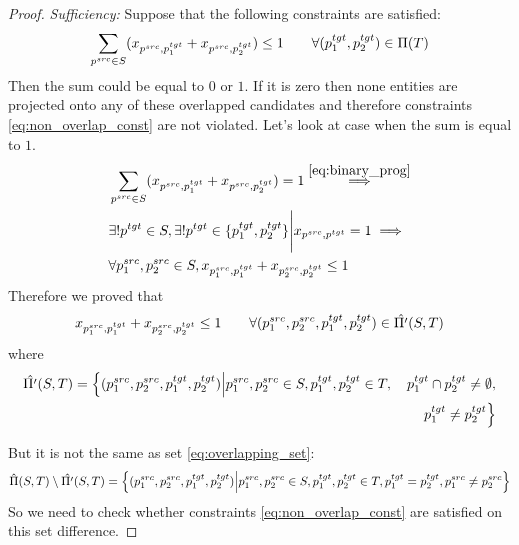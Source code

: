 \begin{proof}
    \textit{Sufficiency:}
    Suppose that the following constraints are satisfied:
    \[
        \sum\limits_{p^{src} \in S} (x_{p^{src}, p_1^{tgt}} + x_{p^{src}, p_2^{tgt}}) \leq 1
        \qquad \forall (p_1^{tgt}, p_2^{tgt}) \in \Pi(T)
    \]
    Then the sum could be equal to \( 0 \) or \( 1 \). If it is zero then none entities are projected onto
    any of these overlapped candidates and therefore constraints \eqref{eq:non_overlap_const} are not violated.
    Let's look at case when the sum is equal to \( 1 \).
    \begin{equation} \label{eq:derivation_of_const_reduction}
        \begin{aligned}
            & \sum\limits_{p^{src} \in S} (x_{p^{src}, p_1^{tgt}} + x_{p^{src}, p_2^{tgt}}) = 1
        \stackrel{\eqref{eq:binary_prog}}{\implies}                                                       \\
         & \exists! p^{tgt} \in S, \exists! p^{tgt} \in \{ p_1^{tgt}, p_2^{tgt}\}
        \Bigg| x_{p^{src}, p^{tgt}} = 1 \implies                                                          \\
         & \forall p_1^{src}, p_2^{src} \in S, x_{p_1^{src}, p_1^{tgt}} + x_{p_2^{src}, p_2^{tgt}} \leq 1
        \end{aligned}
    \end{equation}
    Therefore we proved that
    \[
        x_{p_1^{src}, p_1^{tgt}} + x_{p_2^{src}, p_2^{tgt}} \leq 1 \qquad
        \forall (p_1^{src}, p_2^{src}, p_1^{tgt}, p_2^{tgt}) \in \hat{\Pi'}(S, T)
    \]
    where
    \begin{align*}
        \hat{\Pi'}(S, T) = \Big\{ (p_1^{src}, p_2^{src}, p_1^{tgt}, p_2^{tgt}) \Big| p_1^{src}, p_2^{src} \in S, p_1^{tgt}, p_2^{tgt} \in T, \quad p_1^{tgt} \cap p_2^{tgt} \neq \emptyset, \\
        p_1^{tgt} \neq p_2^{tgt} \Big\}
    \end{align*}

    But it is not the same as set \eqref{eq:overlapping_set}:
    \[
        \hat{\Pi}(S, T) \setminus \hat{\Pi'}(S, T) = \Big\{ (p_1^{src}, p_2^{src}, p_1^{tgt}, p_2^{tgt}) \Big| p_1^{src}, p_2^{src} \in S, p_1^{tgt}, p_2^{tgt} \in T, p_1^{tgt} = p_2^{tgt},
        p_1^{src} \neq p_2^{src} \Big\}
    \]
    So we need to check whether constraints \eqref{eq:non_overlap_const} are satisfied on this set difference.


\end{proof}
